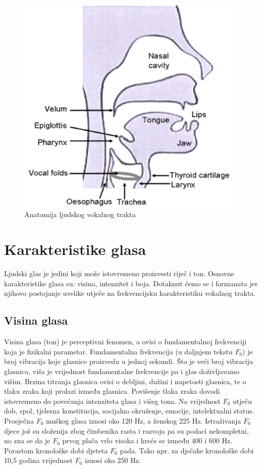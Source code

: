 \documentclass[times, utf8, diplomski]{fer}
\begin{document}
\begin{figure}[hbt!]
 \centering
 \includegraphics[scale=0.5]{photos/vokalni trakt.jpg}
 \caption{Anatomija ljudskog vokalnog trakta}
 \label{trakt}
\end{figure}

\section{Karakteristike glasa}
Ljudski glas je jedini koji može istovremeno proizvesti riječ i ton. Osnovne karakteristike glasa su: visina, intenzitet i boja. Dotaknut ćemo se i formanata jer njihovo postojanje uvelike utječe na frekvencijsku karakteristiku vokalnog trakta. 

\subsection{Visina glasa}
Visina glasa (ton) je perceptivni fenomen, a ovisi o fundamentalnoj frekvenciji koja je fizikalni parametar. Fundamentalna frekvencija (u daljnjem tekstu $F_{0}$) je broj vibracija koje glasnice proizvedu u jednoj sekundi. Što je veći broj vibracija glasnica, viša je vrijednost fundamentalne frekvencije pa i glas doživljavamo višim. Brzina titranja glasnica ovisi o debljini, dužini i napetosti glasnica, te o tlaku zraka koji prolazi između glasnica. Povišenje tlaka zraka dovodi istovremeno do povećanja intenziteta glasa i višeg tona. Na vrijednost $F_{0}$ utječu dob, spol, tjelesna konstitucija, socijalno okruženje, emocije, intelektualni status. Prosječna $F_{0}$ muškog glasa iznosi oko 120 Hz, a ženskog 225 Hz. Istraživanja $F_{0}$ djece još su složenija zbog čimbenika rasta i razvoja pa su podaci nekompletni, no zna se da je $F_{0}$ prvog plača vrlo visoka i kreće se između 400 i 600 Hz. Porastom kronološke dobi djeteta $F_{0}$ pada. Tako npr. za dječake kronološke dobi 10,5 godina vrijednost $F_{0}$ iznosi oko 250 Hz.
\end{document}
